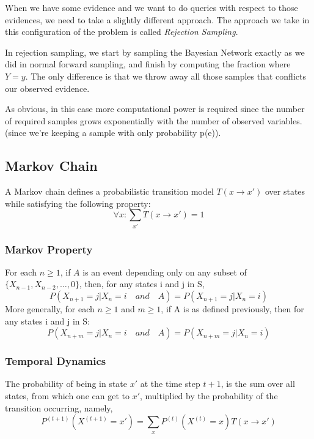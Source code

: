 \documentclass{article}
\begin{document}
    When we have some evidence and we want to do queries with respect to those evidences, we need to take a slightly different approach. The approach we take in this configuration of the problem is called \textit{Rejection Sampling}.

    In rejection sampling, we start by sampling the Bayesian Network exactly as we did in normal forward sampling, and finish by computing the fraction where $Y=y$. The only difference is that we throw away all those samples that conflicts our observed evidence.

    As obvious, in this case more computational power is required since the number of required samples grows exponentially with the number of observed variables. (since we're keeping a sample with only probability p(e)).

\subsection{Markov Chain}

A Markov chain defines a probabilistic transition model $T(x \rightarrow x')$ over states while satisfying the following property:
$$ \forall x: \sum_{x'} T(x \rightarrow x') = 1$$

\subsubsection{Markov Property}
    For each $n \geq 1$, if $A$ is an event depending only on any subset of $\{ X_{n-1}, X_{n-2}, \ldots, 0\}$, then, for any states i and j in S,
    $$ P(X_{n+1}=j|X_n=i \quad and \quad A) = P(X_{n+1} = j| X_n=i)$$
    More generally, for each $n \geq 1$ and $m \geq 1$, if A is as defined previously, then for any states i and j in S:
    $$ P(X_{n+m}=j|X_n=i \quad and \quad A) = P(X_{n+m}=j|X_n=i)$$

\subsubsection{Temporal Dynamics}
    The probability of being in state $x'$ at the time step $t+1$, is the sum over all states, from which one can get to $x'$, multiplied by the probability of the transition occurring, namely,
$$ P^{(t+1)}(X^{(t+1)} = x') = \sum_x P^{(t)}(X^{(t)} = x)T(x \rightarrow x')$$
\end{document}
